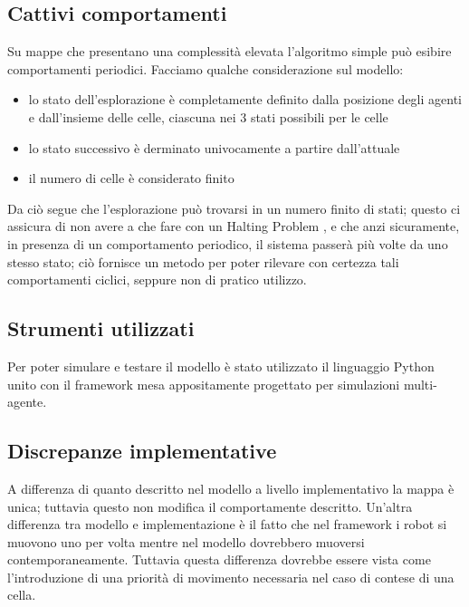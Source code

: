 \subsection{Cattivi comportamenti}
  Su mappe che presentano una complessità elevata l'algoritmo simple può esibire
  comportamenti periodici. Facciamo qualche considerazione sul modello:
  \begin{itemize}
    \item lo stato dell'esplorazione è completamente definito dalla posizione
    degli agenti e dall'insieme delle celle, ciascuna nei 3 stati possibili per
    le celle
    \item lo stato successivo è derminato univocamente a partire dall'attuale
    \item il numero di celle è considerato finito
  \end{itemize}
  Da ciò segue che l'esplorazione può trovarsi in un numero finito di stati;
  questo ci assicura di non avere a che fare con un Halting Problem \cite{wiki:halting},
  e che anzi sicuramente, in presenza di un comportamento periodico, il sistema
  passerà più volte da uno stesso stato; ciò fornisce un metodo per poter rilevare
  con certezza tali comportamenti ciclici, seppure non di pratico utilizzo.
\subsection{Strumenti utilizzati}
  Per poter simulare e testare il modello è stato utilizzato il linguaggio
  Python unito con il framework mesa appositamente progettato per simulazioni
  multi-agente.
\subsection{Discrepanze implementative}
  A differenza di quanto descritto nel modello a livello implementativo la mappa
  è unica; tuttavia questo non modifica il comportamente descritto.
  Un'altra differenza tra modello e implementazione è il fatto che nel framework 
  i robot si muovono uno per volta mentre nel modello dovrebbero muoversi
  contemporaneamente. Tuttavia questa differenza dovrebbe essere vista come
  l'introduzione di una priorità di movimento necessaria nel caso di contese di
  una cella.
